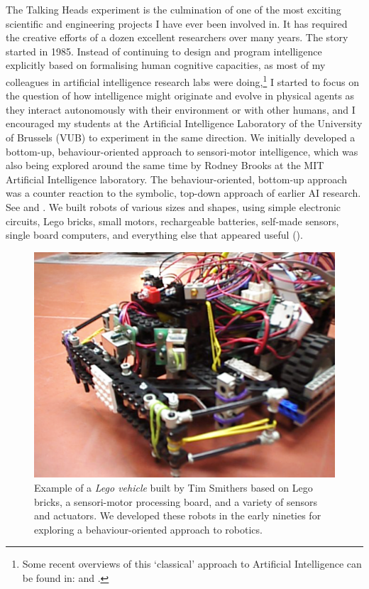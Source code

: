 The Talking Heads experiment is the culmination of one of
the most exciting scientific and engineering projects I have
ever been involved in. It has required the
creative efforts of a dozen excellent researchers 
over many years. The story started in 
1985. Instead of continuing to design and program intelligence
explicitly based on formalising human cognitive
capacities, as most of my colleagues
in artificial intelligence research 
labs were doing,\footnote{
Some recent overviews of this `classical' approach to 
Artificial Intelligence can be found in: \cite{Nilsson:1998} and 
\cite{Russell:1998}.}
I started to focus on the 
question of how intelligence might
originate and evolve in physical agents as they 
interact autonomously with their environment or with 
other humans, and I encouraged my students
at the Artificial Intelligence Laboratory of the University 
of Brussels (VUB) to experiment in the same direction. 
We initially developed a bottom-up, 
behaviour-oriented approach to sensori-motor intelligence, 
which was also being explored around the same time by 
Rodney Brooks at the MIT Artificial Intelligence 
laboratory.
The behaviour-oriented, bottom-up approach  was a 
counter reaction to the symbolic, top-down approach of 
earlier AI research. See \cite{Steels:1995} and \cite{Arkin:1998}. 
We built robots of various sizes and shapes, using simple
electronic circuits, Lego bricks, small motors, rechargeable
batteries, self-made 
sensors, single board computers, and everything else that 
appeared useful (). 


\begin{figure}[htbp]
  \centerline{\includegraphics[width=.60\textwidth]{chap1/figs/robot}}
\caption{ Example of a {\it Lego vehicle} built by Tim Smithers based on Lego bricks, a sensori-motor processing board, 
and a variety of 
sensors and actuators. We developed these robots in the early nineties for exploring a behaviour-oriented 
approach to robotics.}
\label{f:plate3}
\end{figure}

